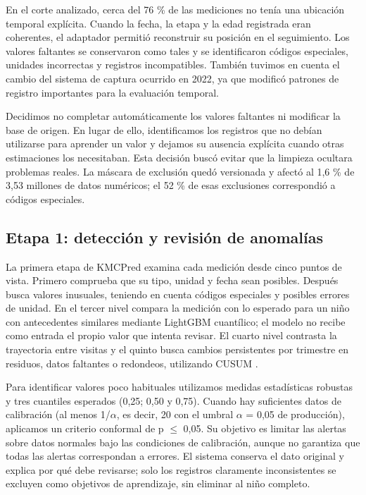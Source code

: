En el corte analizado, cerca del 76 \% de las mediciones no tenía una ubicación temporal explícita. Cuando la fecha, la etapa y la edad registrada eran coherentes, el adaptador permitió reconstruir su posición en el seguimiento. Los valores faltantes se conservaron como tales y se identificaron códigos especiales, unidades incorrectas y registros incompatibles. También tuvimos en cuenta el cambio del sistema de captura ocurrido en 2022, ya que modificó patrones de registro importantes para la evaluación temporal.

Decidimos no completar automáticamente los valores faltantes ni modificar la base de origen. En lugar de ello, identificamos los registros que no debían utilizarse para aprender un valor y dejamos su ausencia explícita cuando otras estimaciones los necesitaban. Esta decisión buscó evitar que la limpieza ocultara problemas reales. La máscara de exclusión quedó versionada y afectó al 1,6 \% de 3,53 millones de datos numéricos; el 52 \% de esas exclusiones correspondió a códigos especiales.

\subsection{Etapa 1: detección y revisión de anomalías}
\label{sec:3.2}

La primera etapa de KMCPred examina cada medición desde cinco puntos de vista. Primero comprueba que su tipo, unidad y fecha sean posibles. Después busca valores inusuales, teniendo en cuenta códigos especiales y posibles errores de unidad. En el tercer nivel compara la medición con lo esperado para un niño con antecedentes similares mediante LightGBM cuantílico; el modelo no recibe como entrada el propio valor que intenta revisar. El cuarto nivel contrasta la trayectoria entre visitas y el quinto busca cambios persistentes por trimestre en residuos, datos faltantes o redondeos, utilizando CUSUM \cite{r12,r13,r14,r15,r16,r17,r25,r26}.

Para identificar valores poco habituales utilizamos medidas estadísticas robustas y tres cuantiles esperados (0,25; 0,50 y 0,75). Cuando hay suficientes datos de calibración (al menos 1/$\alpha$, es decir, 20 con el umbral $\alpha$ = 0,05 de producción), aplicamos un criterio conformal de p $\leq$ 0,05. Su objetivo es limitar las alertas sobre datos normales bajo las condiciones de calibración, aunque no garantiza que todas las alertas correspondan a errores. El sistema conserva el dato original y explica por qué debe revisarse; solo los registros claramente inconsistentes se excluyen como objetivos de aprendizaje, sin eliminar al niño completo.

